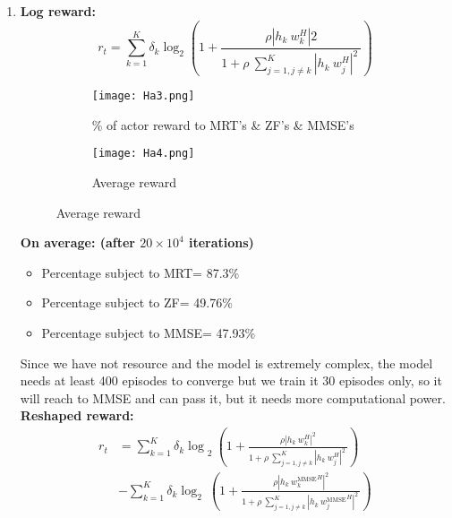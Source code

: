 \begin{enumerate}
    \item \textbf{Log reward:}
    \begin{equation}
        \label{eq:Log reward model 1}
        r_t=\sum_{k=1}^{K}{\delta_k \log_2 \left(1+\frac{{{\rho}\left|{h}_{k}\ {w}_{k}^{H}\right|}2}{{1}+{\rho}\ \sum_{{j}={1},{j}\neq{k}}^{{K}}{\left|{h}_{k}\ {w}_{j}^{H}\right|^{2}\ }}\right)}
    \end{equation}
    \begin{figure}[H]
        \centering
        \begin{subfigure}{.5\textwidth}
          \centering
          \texttt{[image: Ha3.png]}
          \caption{\% of actor reward to MRT's \& ZF's \& MMSE's}
          \label{fig:highSNR Model1}
        \end{subfigure}%
        \begin{subfigure}{.5\textwidth}
          \centering
          \texttt{[image: Ha4.png]}
          \caption{Average reward}
          \label{fig:highSNR Model1_1}
        \end{subfigure}
    \end{figure}
    \textbf{On average: (after $20 \times {10}^4$ iterations)}
    \begin{itemize}
        \item Percentage subject to MRT= 87.3\%
        \item Percentage subject to ZF= 49.76\%
        \item Percentage subject to MMSE= 47.93\%
    \end{itemize}
    Since we have not resource and the model is extremely complex, the model needs at least 400 episodes to converge but we train it 30 episodes only, so it will reach to MMSE and can pass it, but it needs more computational power.\\
    \textbf{Reshaped reward:}
    \begin{equation}
        \label{eq:reshaped model}
        \begin{aligned}
            {r}_{t} & = \sum_{{k}=1}^{{K}}{{{\delta}_{k} \log}_{2}\ \left(1+\frac{{{\rho}\left|{h}_{k}\ {w}_{k}^{H}\right|}^{2}}{{1}+{\rho}\ \sum_{{j}={1},{j}\neq{k}}^{{K}}{\left|{h}_{k}\ {w}_{j}^{H}\right|^{2}\ }}\right)} \\
            & - \sum_{{k}={1}}^{{K}}{{\delta}_{k} \log_2\ \left({1}+\frac{{{\rho}\left|{h}_{k}\ {{w}_{k}^{{\text{MMSE}}}}^{H}\right|}^{2}}{{1}+{\rho}\ \sum_{{j}={1},{j}\neq{k}}^{{K}}{\left|{h}_{k}\ {{w}_{j}^{{\text{MMSE}}}}^{H}\right|^{2}\ }}\right)}\\

\end{aligned}
\end{equation}
\end{enumerate}

